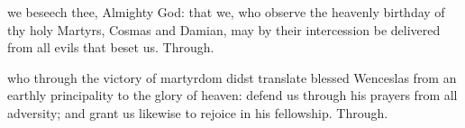 
\memorialCollect
{} we beseech thee, Almighty God: that we, who observe the heavenly birthday of thy holy Martyrs, Cosmas and Damian, may by their intercession be delivered from all evils that beset us. Through.


\clearpage
{}

\memorialCollect
{} who through the victory of martyrdom didst translate blessed Wenceslas from an earthly principality to the glory of heaven: defend us through his prayers from all adversity; and grant us likewise to rejoice in his fellowship. Through.


\label{Michaelmas}


